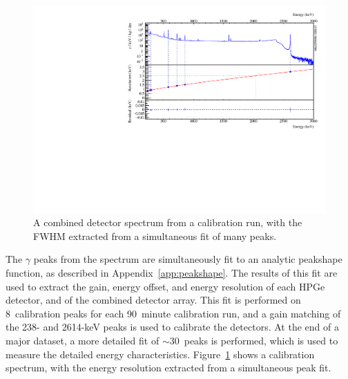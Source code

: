 \documentclass[/main.tex]{subfiles}
\begin{document}
\begin{figure}
  \centering
  \includegraphics[width=\textwidth]{calfwhm}
  \caption[Calibration spectrum with FWHM]{\label{fig:calfwhm}
    A combined detector spectrum from a  calibration run, with the FWHM extracted from a simultaneous fit of many peaks.
  }
\end{figure}
The $\gamma$ peaks from the  spectrum are simultaneously fit to an analytic peakshape function, as described in Appendix~\ref{app:peakshape}.
The results of this fit are used to extract the gain, energy offset, and energy resolution of each HPGe detector, and of the combined detector array.
This fit is performed on 8~calibration peaks for each 90~minute calibration run, and a gain matching of the 238- and 2614-keV peaks is used to calibrate the detectors.
At the end of a major dataset, a more detailed fit of $\sim30$~peaks is performed, which is used to measure the detailed energy characteristics.
Figure~\ref{fig:calfwhm} shows a  calibration spectrum, with the energy resolution extracted from a simultaneous peak fit.
\end{document}
